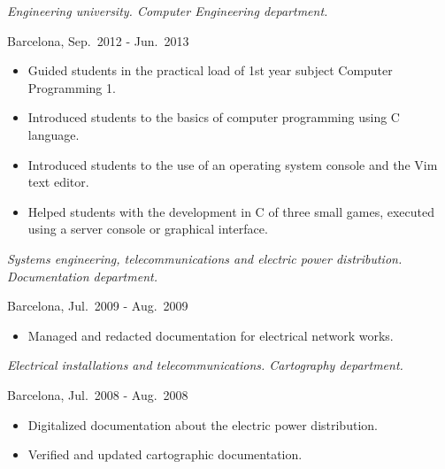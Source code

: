 \begin{description}[itemsep=15pt]
        \emph{Engineering university. Computer Engineering department.}

        Barcelona, Sep.\ 2012 - Jun.\ 2013
        \begin{itemize}[itemsep=0pt]
            \item Guided students in the practical load of 1st year subject Computer Programming 1.
            \item Introduced students to the basics of computer programming using C language.
            \item Introduced students to the use of an operating system console and the Vim text editor.
            \item Helped students with the development in C of three small games, executed using a server console or graphical interface.
        \end{itemize}

    \item[\href{http://www.itc2.com}{ITC-2}, Technical Assistant] \hfill

        \emph{Systems engineering, telecommunications and electric power distribution. Documentation department.}

        Barcelona, Jul.\ 2009 - Aug.\ 2009
        \begin{itemize}[itemsep=0pt]
            \item Managed and redacted documentation for electrical network works.
        \end{itemize}

    \item[\href{http://sparkiberica.com}{Spark Ibérica}, Technical Assistant] \hfill

        \emph{Electrical installations and telecommunications. Cartography department.}

        Barcelona, Jul.\ 2008 - Aug.\ 2008
        \begin{itemize}[itemsep=0pt]
            \item Digitalized documentation about the electric power distribution.
            \item Verified and updated cartographic documentation.
        \end{itemize}

\end{description}